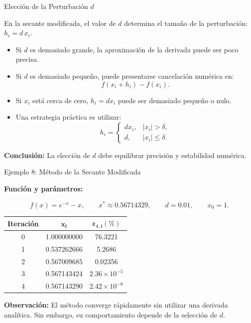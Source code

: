 \documentclass[../../main.tex]{subfiles}
\begin{document}
\begin{frame}{Elección de la Perturbación \(d\)}

En la secante modificada, el valor de \(d\) determina el tamaño
de la perturbación:
\(
h_i=d\,x_i.
\)
\begin{itemize}
  \item Si \(d\) es demasiado grande, la aproximación de la
        derivada puede ser poco precisa.
  \item Si \(d\) es demasiado pequeño, puede presentarse
        cancelación numérica en:
  \[
  f(x_i+h_i)-f(x_i).
  \]
  \item Si \(x_i\) está cerca de cero, \(h_i=d x_i\) puede ser
        demasiado pequeño o nulo.
  \item Una estrategia práctica es utilizar:
  \[
  h_i=
  \begin{cases}
  d x_i, & |x_i|>\delta,\\
  d,     & |x_i|\leq\delta.
  \end{cases}
  \]
\end{itemize}
\textbf{Conclusión:}
La elección de \(d\) debe equilibrar precisión y estabilidad numérica.
\end{frame}



\begin{frame}{Ejemplo 8: Método de la Secante Modificada}

\textbf{Función y parámetros:}

\[
f(x)=e^{-x}-x,
\qquad
x^*\approx0.56714329,
\qquad
d=0.01,
\qquad
x_0=1.
\]

\centering
\small

\begin{tabular}{|c|c|c|}
\hline
\textbf{Iteración} &
\(\boldsymbol{x_i}\) &
\(\boldsymbol{\varepsilon_{t,i}(\%)}\) \\ \hline
0 & 1.000000000 & 76.3221 \\ 
1 & 0.537262666 & 5.2686 \\ 
2 & 0.567009685 & 0.02356 \\ 
3 & 0.567143424 & \(2.36\times10^{-5}\) \\ 
4 & 0.567143290 & \(2.42\times10^{-8}\) \\ \hline
\end{tabular}

\vspace{0.7em}

\raggedright

\textbf{Observación:}
El método converge rápidamente sin utilizar una derivada analítica.
Sin embargo, su comportamiento depende de la selección de \(d\).

\end{frame}
\end{document}
